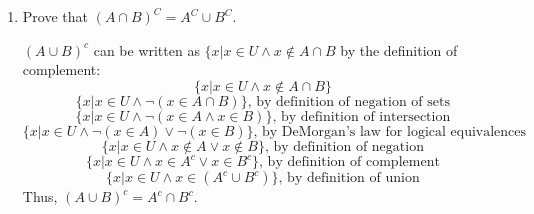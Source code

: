 \documentclass{article}
\begin{document}
\begin{enumerate}
    \item Prove that $(A \cap B)^C = A^C \cup B^C$.
            \begin{mdframed}
                $(A \cup B)^c$ can be written as $\{x | x \in U \wedge x \notin A \cap B$ by the definition of complement:
                \begin{equation}
                    \{x | x \in U \wedge x \notin A \cap B\}
                \end{equation}
                \begin{equation}
                    \{x | x \in U \wedge \neg (x \in A \cap B)\}\text{, by definition of negation of sets}
                \end{equation}
                \begin{equation}
                    \{x | x \in U \wedge \neg (x \in A \wedge x \in B)\}\text{, by definition of intersection}
                \end{equation}
                \begin{equation}
                    \{x | x \in U \wedge \neg (x \in A) \vee \neg (x \in B)\}\text{, by DeMorgan's law for logical equivalences}
                \end{equation}
                \begin{equation}
                    \{x | x \in U \wedge x \notin A \vee x \notin B\}\text{, by definition of negation}
                \end{equation}
                \begin{equation}
                    \{x | x \in U \wedge x \in A^c \vee x \in B^c\}\text{, by definition of complement}
                \end{equation}
                \begin{equation}
                    \{x | x \in U \wedge x \in (A^c \cup B^c)\}\text{, by definition of union}
                \end{equation}
                Thus, $(A \cup B)^c=A^c \cap B^c$.
            \end{mdframed}
    

\end{enumerate}
\end{document}
